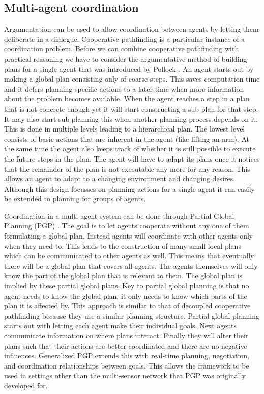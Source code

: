 \subsection{Multi-agent coordination}
Argumentation can be used to allow coordination between agents by letting them
deliberate in a dialogue. Cooperative pathfinding is a particular instance of a
coordination problem. Before we can combine cooperative pathfinding with
practical reasoning we have to consider the
argumentative method of building plans for a single agent that was introduced
by Pollock \cite{pollock1995}. An agent starts out by making a global plan
consisting only of coarse steps. This saves computation time and it defers
planning specific actions to a later time when more information about the
problem becomes available. When the agent reaches a step in a plan that is not
concrete enough yet it will start constructing a sub-plan for that step. It may
also start sub-planning this when another planning process depends on it. This
is done in
multiple levels leading to a hierarchical plan. The lowest level consists of
basic actions that are inherent in the agent (like lifting an arm). At the same
time the agent also keeps track of whether it is still possible to execute the
future steps in the plan. The agent will have to adapt its plans once it
notices that the remainder of the plan is not executable any more for any
reason. This allows an agent to adapt to a changing environment and changing
desires. Although this design focusses on planning actions for a single agent
it can easily be extended to planning for groups of agents.

Coordination in a multi-agent system can be done through Partial Global
Planning (PGP) \cite[pp. 202--204]{durfee1991,decker1992,woodridge2009}. The
goal is to
let agents cooperate without any one of them formulating a global plan. Instead
agents will coordinate with other agents only when they need to. This leads to
the construction of many small local plans which can be communicated to other
agents as well. This means that eventually there will be a global plan that
covers all agents. The agents themselves will only know the part of the global
plan that is relevant to them. The global plan is implied by these partial
global plans. Key to
partial global planning is that no agent needs to know the global plan, it only
needs to know which parts of the plan it is affected by. This approach is
similar to that of decoupled cooperative pathfinding because they use a similar
planning structure. Partial global planning starts out with letting each agent
make their individual goals. Next agents communicate information on where plans
interact. Finally they will alter their plans such that their actions are
better coordinated and there are no negative influences. Generalized PGP
\cite{decker1992} extends this with real-time planning, negotiation, and
coordination relationships between goals. This allows the framework to be used
in settings other than the multi-sensor network that PGP was originally
developed for.

